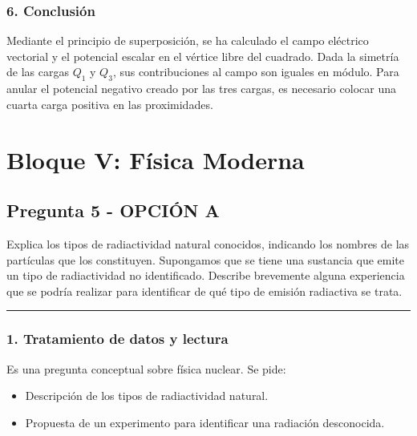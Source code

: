 \subsubsection*{6. Conclusión}
\begin{cajaconclusion}
Mediante el principio de superposición, se ha calculado el campo eléctrico vectorial y el potencial escalar en el vértice libre del cuadrado. Dada la simetría de las cargas $Q_1$ y $Q_3$, sus contribuciones al campo son iguales en módulo. Para anular el potencial negativo creado por las tres cargas, es necesario colocar una cuarta carga positiva en las proximidades.
\end{cajaconclusion}

\newpage
\section{Bloque V: Física Moderna}
\label{sec:moderna1_2016_jul_ext}
\subsection{Pregunta 5 - OPCIÓN A}
\label{subsec:5A_2016_jul_ext}
\begin{cajaenunciado}
Explica los tipos de radiactividad natural conocidos, indicando los nombres de las partículas que los constituyen. Supongamos que se tiene una sustancia que emite un tipo de radiactividad no identificado. Describe brevemente alguna experiencia que se podría realizar para identificar de qué tipo de emisión radiactiva se trata.
\end{cajaenunciado}
\hrule

\subsubsection*{1. Tratamiento de datos y lectura}
Es una pregunta conceptual sobre física nuclear. Se pide:
\begin{itemize}
    \item Descripción de los tipos de radiactividad natural.
    \item Propuesta de un experimento para identificar una radiación desconocida.
\end{itemize}

